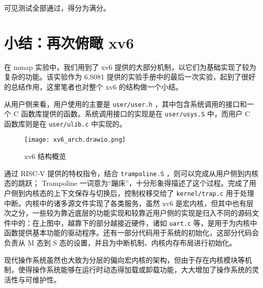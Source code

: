 可见测试全部通过，得分为满分。

\section{小结：再次俯瞰 xv6}

在 mmap 实验中，我们用到了 xv6 提供的大部分机制，以它们为基础实现了较为复杂的功能。该实验作为 6.S081 提供的实验手册中的最后一次实验，起到了很好的总结作用，这里笔者也对整个 xv6 的结构做一个小结。

从用户侧来看，用户使用的主要是 \lstinline{user/user.h} ，其中包含系统调用的接口和一个 C 函数库提供的函数。系统调用接口的实现是在 \lstinline{user/usys.S} 中，而用户 C 函数库则是在 \lstinline{user/ulib.c} 中实现的。

\begin{figure}[H]
  \centering
  \texttt{[image: xv6\_arch.drawio.png]}
  \caption{ xv6 结构概览 }
\end{figure}

通过 RISC-V 提供的特权指令，结合 \lstinline{trampoline.S} ，则可以完成从用户侧到内核态的跳跃； Trampoline 一词意为“蹦床”，十分形象得描述了这个过程。完成了用户侧到内核态的上下文保存与切换后，控制权移交给了 \lstinline{kernel/trap.c} 用于处理中断。内核中的诸多源文件实现了各类服务，虽然 xv6 是宏内核，但其中也有层次之分，一些较为靠近底层的功能实现和较靠近用户侧的实现是归入不同的源码文件中的：在上图中，越靠下的部分越接近硬件，诸如 \lstinline{uart.c} 等，是用于为内核中函数提供基本功能的驱动程序。还有一部分代码用于系统的初始化，这部分代码会负责从 M 态到 S 态的设置，并且为中断机制、内核内存布局进行初始化。

现代操作系统虽然也大致为分层的偏向宏内核的架构，但由于存在内核模块等机制，使得操作系统能够在运行时动态得加载或卸载功能，大大增加了操作系统的灵活性与可维护性。